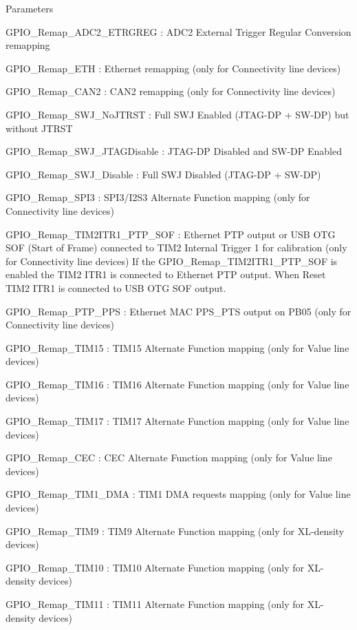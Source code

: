 \begin{DoxyParams}{Parameters}
\begin{DoxyItemize}
\item G\-P\-I\-O\-\_\-\-Remap\-\_\-\-A\-D\-C2\-\_\-\-E\-T\-R\-G\-R\-E\-G \-: A\-D\-C2 External Trigger Regular Conversion remapping \item G\-P\-I\-O\-\_\-\-Remap\-\_\-\-E\-T\-H \-: Ethernet remapping (only for Connectivity line devices) \item G\-P\-I\-O\-\_\-\-Remap\-\_\-\-C\-A\-N2 \-: C\-A\-N2 remapping (only for Connectivity line devices) \item G\-P\-I\-O\-\_\-\-Remap\-\_\-\-S\-W\-J\-\_\-\-No\-J\-T\-R\-S\-T \-: Full S\-W\-J Enabled (J\-T\-A\-G-\/\-D\-P + S\-W-\/\-D\-P) but without J\-T\-R\-S\-T \item G\-P\-I\-O\-\_\-\-Remap\-\_\-\-S\-W\-J\-\_\-\-J\-T\-A\-G\-Disable \-: J\-T\-A\-G-\/\-D\-P Disabled and S\-W-\/\-D\-P Enabled \item G\-P\-I\-O\-\_\-\-Remap\-\_\-\-S\-W\-J\-\_\-\-Disable \-: Full S\-W\-J Disabled (J\-T\-A\-G-\/\-D\-P + S\-W-\/\-D\-P) \item G\-P\-I\-O\-\_\-\-Remap\-\_\-\-S\-P\-I3 \-: S\-P\-I3/\-I2\-S3 Alternate Function mapping (only for Connectivity line devices) \item G\-P\-I\-O\-\_\-\-Remap\-\_\-\-T\-I\-M2\-I\-T\-R1\-\_\-\-P\-T\-P\-\_\-\-S\-O\-F \-: Ethernet P\-T\-P output or U\-S\-B O\-T\-G S\-O\-F (Start of Frame) connected to T\-I\-M2 Internal Trigger 1 for calibration (only for Connectivity line devices) If the G\-P\-I\-O\-\_\-\-Remap\-\_\-\-T\-I\-M2\-I\-T\-R1\-\_\-\-P\-T\-P\-\_\-\-S\-O\-F is enabled the T\-I\-M2 I\-T\-R1 is connected to Ethernet P\-T\-P output. When Reset T\-I\-M2 I\-T\-R1 is connected to U\-S\-B O\-T\-G S\-O\-F output. \item G\-P\-I\-O\-\_\-\-Remap\-\_\-\-P\-T\-P\-\_\-\-P\-P\-S \-: Ethernet M\-A\-C P\-P\-S\-\_\-\-P\-T\-S output on P\-B05 (only for Connectivity line devices) \item G\-P\-I\-O\-\_\-\-Remap\-\_\-\-T\-I\-M15 \-: T\-I\-M15 Alternate Function mapping (only for Value line devices) \item G\-P\-I\-O\-\_\-\-Remap\-\_\-\-T\-I\-M16 \-: T\-I\-M16 Alternate Function mapping (only for Value line devices) \item G\-P\-I\-O\-\_\-\-Remap\-\_\-\-T\-I\-M17 \-: T\-I\-M17 Alternate Function mapping (only for Value line devices) \item G\-P\-I\-O\-\_\-\-Remap\-\_\-\-C\-E\-C \-: C\-E\-C Alternate Function mapping (only for Value line devices) \item G\-P\-I\-O\-\_\-\-Remap\-\_\-\-T\-I\-M1\-\_\-\-D\-M\-A \-: T\-I\-M1 D\-M\-A requests mapping (only for Value line devices) \item G\-P\-I\-O\-\_\-\-Remap\-\_\-\-T\-I\-M9 \-: T\-I\-M9 Alternate Function mapping (only for X\-L-\/density devices) \item G\-P\-I\-O\-\_\-\-Remap\-\_\-\-T\-I\-M10 \-: T\-I\-M10 Alternate Function mapping (only for X\-L-\/density devices) \item G\-P\-I\-O\-\_\-\-Remap\-\_\-\-T\-I\-M11 \-: T\-I\-M11 Alternate Function mapping (only for X\-L-\/density devices) \item 
\end{DoxyItemize}
\end{DoxyParams}

